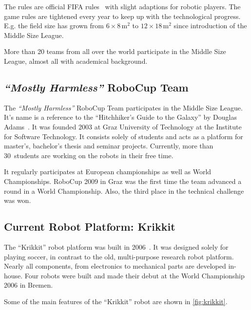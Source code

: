 \documentclass[12pt,a4paper]{article}
\newcommand{\MH}{\emph{``Mostly Harmless''} RoboCup Team\xspace}
\newcommand{\MSL}{Middle Size League\xspace}
\begin{document}
The rules are official FIFA rules~\cite{msl-rules} with slight adaptions for robotic players.
The game rules are tightened every year to keep up with the technological progress. 
E.g. the field size has grown from $6\times8$\,m$^2$ to $12\times18$\,m$^2$ since introduction of the \MSL.

More than 20 teams from all over the world participate in the \MSL, almost all with academical background.


\subsection{\MH}

The \MH participates in the \MSL. 
It's name is a reference to the ``Hitchhiker's Guide to the Galaxy'' by Douglas Adams~\cite{h2g2}.
It was founded 2003 at Graz University of Technology at the Institute for Software Technology. 
It consists solely of students and acts as a platform for master's, bachelor's thesis and seminar projects.
Currently, more than 30~students are working on the robots in their free time.

It regularly participates at European championships as well as World Championships.
RoboCup 2009 in Graz was the first time the team advanced a round in a World Championship. 
Also, the third place in the technical challenge was won.




\subsection{Current Robot Platform: Krikkit}

The ``Krikkit'' robot platform was built in 2006~\cite{}. 
It was designed solely for playing soccer, in contrast to the old, multi-purpose research robot platform.
Nearly all components, from electronics to mechanical parts are developed in-house.
Four robots were built and made their debut at the World Championship 2006 in Bremen.

Some of the main features of the ``Krikkit'' robot are shown in \autoref{fig:krikkit}.
\end{document}
